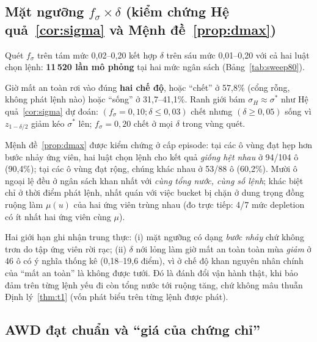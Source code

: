 \documentclass[10pt]{article}
\begin{document}
\subsection{Mặt ngưỡng $f_\sigma \times \delta$ (kiểm chứng Hệ quả~\ref{cor:sigma} và Mệnh đề~\ref{prop:dmax})}
\label{sec:sweep}

Quét $f_\sigma$ trên tám mức 0,02--0,20 kết hợp $\delta$ trên sáu mức 0,01--0,20 với cả hai luật chọn lệnh: \textbf{11\,520 lần mô phỏng} tại hai mức ngân sách (Bảng~\ref{tab:sweep80}).

\begin{table}[t]
\centering
\caption{Giờ mất an toàn (\%) trên mặt $(f_\sigma,\delta)$; severe, $B{=}80$\,mm, chính sách đề xuất. Mức 57,8\% $=$ ``cổng rỗng'', bằng mức ruộng không được tưới.}
\label{tab:sweep80}
\scriptsize

\end{table}

Giờ mất an toàn rơi vào đúng \textbf{hai chế độ}, hoặc ``chết'' ở 57,8\% (cổng rỗng, không phát lệnh nào) hoặc ``sống'' ở 31,7--41,1\%. Ranh giới bám $\sigma_H \approx \sigma^{*}$ như Hệ quả~\ref{cor:sigma} dự đoán: $(f_\sigma{=}0{,}10;\delta\le0{,}03)$ chết nhưng $(\delta\ge0{,}05)$ sống vì $z_{1-\delta/2}$ giảm kéo $\sigma^{*}$ lên; $f_\sigma{=}0{,}20$ chết ở mọi $\delta$ trong vùng quét.

Mệnh đề~\ref{prop:dmax} được kiểm chứng ở cấp episode: tại các ô vùng đạt hẹp hơn bước nhảy ứng viên, hai luật chọn lệnh cho kết quả \emph{giống hệt nhau} ở 94/104 ô (90,4\%); tại các ô vùng đạt rộng, chúng khác nhau ở 53/88 ô (60,2\%). Mười ô ngoại lệ đều ở ngân sách khan nhất với \emph{cùng tổng nước, cùng số lệnh}; khác biệt chỉ ở thời điểm phát lệnh, nhất quán với việc bucket bị chặn ở dung trọng đồng ruộng làm $\mu(u)$ của hai ứng viên trùng nhau (đo trực tiếp: 4/7 mức depletion có ít nhất hai ứng viên cùng $\mu$).

Hai giới hạn ghi nhận trung thực: (i) mặt ngưỡng có dạng \emph{bước nhảy} chứ không trơn do tập ứng viên rời rạc; (ii) $\delta$ nới lỏng làm giờ mất an toàn toàn mùa \emph{giảm} ở 46 ô có ý nghĩa thống kê (0,18--19,6 điểm), vì ở chế độ khan nguyên nhân chính của ``mất an toàn'' là không được tưới. Đó là đánh đổi vận hành thật, khi bảo đảm trên từng lệnh yếu đi còn tổng nước tới ruộng tăng, chứ không mâu thuẫn Định lý~\ref{thm:t1} (vốn phát biểu trên từng lệnh được phát).

\subsection{AWD đạt chuẩn và ``giá của chứng chỉ''}
\label{sec:awd}
\end{document}
